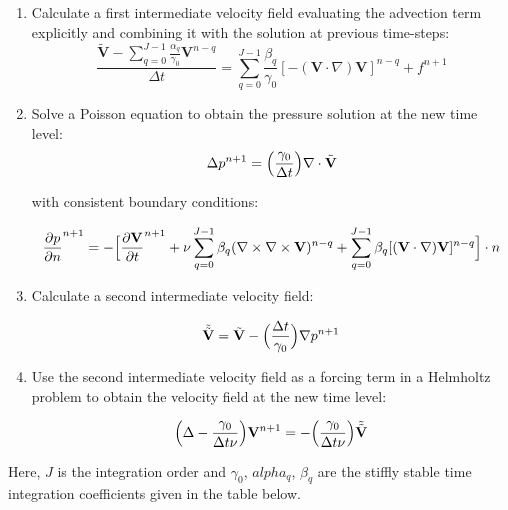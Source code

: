 \begin{enumerate}
\item Calculate a first intermediate velocity field evaluating the advection term explicitly and combining it with the solution at previous time-steps:
\begin{equation}
 \frac{\tilde{\mathbf{V}}-\sum_{q=0}^{J-1}\frac{\alpha_q}{\gamma_0}\mathbf{V}^{n-q}}{\Delta t}=\sum_{q=0}^{J-1}\frac{\beta_q}{\gamma_0}[-(\mathbf{V}\cdot\nabla)\mathbf{V}]^{n-q} + f^{n+1}\end{equation}
 
 \item Solve a Poisson equation to obtain the pressure solution at the new time level:
 \begin{equation}
  \Delta p^{n+1}=\Bigl(\frac{\gamma_0}{\Delta t}\Bigr)\nabla\cdot\tilde{\mathbf{V}}
 \end{equation}

with consistent boundary conditions:

\begin{equation}
 \frac{\partial p}{\partial n}^{n+1}= - \Bigl[ \frac{\partial \mathbf{V}}{\partial t}^{n+1} + \nu \sum_{q=0}^{J-1}\beta_q(\nabla \times \nabla \times   \mathbf{V})^{n-q} + \sum_{q=0}^{J-1}\beta_q [(\mathbf{V} \cdot \nabla)\mathbf{V}]^{n-q}\Bigr]\cdot n
\end{equation}


\item  Calculate a second intermediate velocity field:

\begin{equation}
 \tilde{\tilde{\mathbf{V}}}=\tilde{\mathbf{V}}-\Bigl(\frac{\Delta t}{\gamma_0}\Bigr)\nabla p^{n+1}
\end{equation}
 
 \item Use the second intermediate velocity field as a forcing term in a Helmholtz problem to obtain the velocity field at the new time level:
 
 \begin{equation}
  \Bigl(\Delta-\frac{\gamma_0}{\Delta t \nu}\Bigr)\mathbf{V}^{n+1}=-\Bigl(\frac{\gamma_0}{\Delta t \nu}\Bigr)\tilde{\tilde{\mathbf{V}}}
 \end{equation}
 
 \end{enumerate}
 
Here, $J$ is the integration order and $\gamma_0$, $alpha_q$, $\beta_q$
are the stiffly stable time integration coefficients given in the table below.

